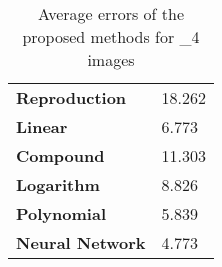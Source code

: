 \begin{table}[H]
  \caption{Average errors of the proposed methods for _4 images }
      \begin{tabularx}{\textwidth}{C C}
    \toprule
        \textbf{Reproduction} & 18.262\\ 
        \textbf{Linear} & 6.773\\ 
        \textbf{Compound} & 11.303\\ 
        \textbf{Logarithm} & 8.826\\ 
        \textbf{Polynomial} & 5.839\\ 
        \textbf{Neural Network} & 4.773\\ 
    \bottomrule
    \end{tabularx}
\end{table}
